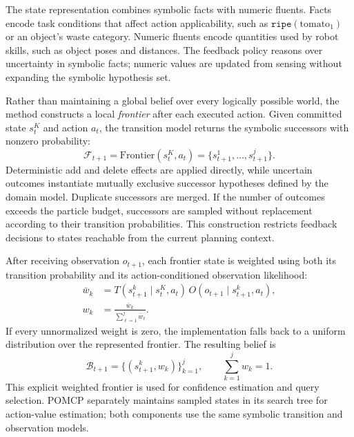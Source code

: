 \label{method:belief_rep}
The state representation combines symbolic facts with numeric fluents. Facts encode task conditions that affect action applicability, such as $\texttt{ripe}(\text{tomato}_1)$ or an object's waste category. Numeric fluents encode quantities used by robot skills, such as object poses and distances. The feedback policy reasons over uncertainty in symbolic facts; numeric values are updated from sensing without expanding the symbolic hypothesis set.

Rather than maintaining a global belief over every logically possible world, the method constructs a local \emph{frontier} after each executed action. Given committed state $s_t^{K}$ and action $a_t$, the transition model returns the symbolic successors with nonzero probability:
\begin{equation}
\mathcal{F}_{t+1}
=
\mathrm{Frontier}(s_t^{K},a_t)
=
\{s_{t+1}^{1},\ldots,s_{t+1}^{j}\}.
\label{eq:frontier}
\end{equation}
Deterministic add and delete effects are applied directly, while uncertain outcomes instantiate mutually exclusive successor hypotheses defined by the domain model. Duplicate successors are merged. If the number of outcomes exceeds the particle budget, successors are sampled without replacement according to their transition probabilities. This construction restricts feedback decisions to states reachable from the current planning context.

After receiving observation $o_{t+1}$, each frontier state is weighted using both its transition probability and its action-conditioned observation likelihood:
\begin{equation}
\begin{aligned}
\bar{w}_{k}
&=T(s_{t+1}^{k}\mid s_t^{K},a_t)\,
O(o_{t+1}\mid s_{t+1}^{k},a_t),\\
w_k&=\frac{\bar{w}_k}{\sum_{\ell=1}^{j}\bar{w}_{\ell}}.
\end{aligned}
\label{eq:belief_update}
\end{equation}
If every unnormalized weight is zero, the implementation falls back to a uniform distribution over the represented frontier. The resulting belief is
\begin{equation}
\mathcal{B}_{t+1}
=
\{(s_{t+1}^{k},w_k)\}_{k=1}^{j},
\qquad
\sum_{k=1}^{j}w_k=1.
\label{eq:symbolic_belief}
\end{equation}
This explicit weighted frontier is used for confidence estimation and query selection. POMCP separately maintains sampled states in its search tree for action-value estimation; both components use the same symbolic transition and observation models.

